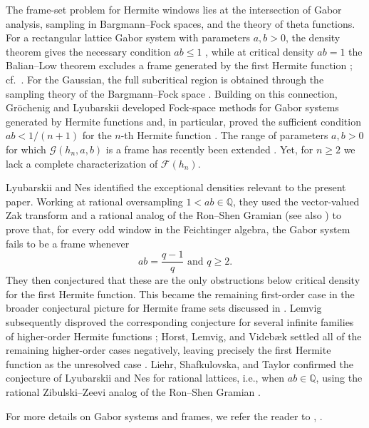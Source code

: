 \documentclass[11pt]{amsart}
\numberwithin{equation}{section}
\theoremstyle{definition}
\theoremstyle{remark}
\newcommand{\Q}{\mathbb Q}
\newcommand{\cG}{\mathcal G}
\newcommand{\cF}{\mathcal F}
\begin{document}
The frame-set problem for Hermite windows lies at the intersection of Gabor analysis, sampling in Bargmann--Fock spaces, and the theory of theta functions. For a rectangular lattice Gabor system with parameters $a,b>0$, the density theorem gives the necessary condition $ab\leq 1$ \cite{HeilDensity}, while at critical density $ab=1$ the Balian--Low theorem excludes a frame generated by the first Hermite function \cite{Balian,Low}; cf.~\cite{BHW}. For the Gaussian, the full subcritical region is obtained through the sampling theory of the Bargmann--Fock space \cite{Lyubarskii1992,Seip1992,SeipWallsten1992}. Building on this connection, Gr\"ochenig and Lyubarskii developed Fock-space methods for Gabor systems generated by Hermite functions and, in particular, proved the sufficient condition $ab<1/(n+1)$ for the $n$-th Hermite function \cite{GrochenigLyubarskii2007,GrochenigLyubarskii2009}. The range of parameters $a,b>0$ for which $\cG(h_n,a,b)$ is a frame has recently been extended \cite{FauShaZlo25, FauShaZlo26}. Yet, for $n\geq2$ we lack a complete characterization of $\cF(h_n)$.

Lyubarskii and Nes \cite{LN} identified the exceptional densities relevant to the present paper.  Working at rational oversampling $1 < ab \in \Q$, they used the vector-valued Zak transform and a rational analog of the Ron--Shen Gramian \cite{RonShen1997} (see also \cite{ZibZee97}) to prove that, for every odd window in the Feichtinger algebra, the Gabor system fails to be a frame whenever
\begin{equation}
        ab=\frac{q-1}{q}  \text{ and } q\geq 2.
\end{equation}
They then conjectured that these are the only obstructions below critical density for the first Hermite function. This became the remaining first-order case in the broader conjectural picture for Hermite frame sets discussed in \cite{Gro14}. Lemvig subsequently disproved the corresponding conjecture for several infinite families of higher-order Hermite functions \cite{Lem17}; Horst, Lemvig, and Videb{\ae}k settled all of the remaining higher-order cases negatively, leaving precisely the first Hermite function as the unresolved case \cite{HorLemVid25}. Liehr, Shafkulovska, and Taylor \cite{LieShafTay} confirmed the conjecture of Lyubarskii and Nes \cite{LN} for rational lattices, i.e., when $ab \in \Q$, using the rational Zibulski--Zeevi analog \cite{ZibZee97} of the Ron--Shen Gramian \cite{RonShen1997}.

For more details on Gabor systems and frames, we refer the reader to \cite{Christensen_2016}, \cite{GroechenigBook}.
\end{document}
